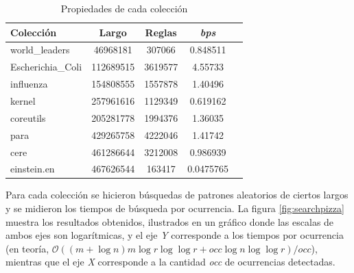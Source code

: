 \begin{table}[h!]
\centering
\begin{tabular}{|l|c|c|c|c|}
\hline
\textbf{Colección} & \textbf{Largo} & \textbf{Reglas} & \textit{bps}\\ \hline  
world\_leaders & 46968181 & 307066 &  0.848511 \\ \hline  
Escherichia\_Coli & 112689515 & 3619577 &  4.55733 \\ \hline  
influenza & 154808555 &1557878 & 1.40496\\ \hline  
kernel & 257961616 &1129349 & 0.619162 \\ \hline  
coreutils & 205281778 & 1994376 & 1.36035 \\ \hline
para&429265758 &4222046 &  1.41742 \\ \hline  
cere & 461286644 & 3212008 & 0.986939 \\ \hline
einstein.en & 467626544  & 163417 &  0.0475765 \\ \hline  
\end{tabular}
\caption{Propiedades de cada colección}
\label{tab:collect}
\end{table}



Para cada colección se hicieron búsquedas de patrones aleatorios de ciertos largos y se midieron los tiempos de búsqueda por ocurrencia. La figura \ref{fig:searchpizza} muestra los resultados obtenidos, ilustrados en un gráfico donde las escalas de ambos ejes son logarítmicas, y el eje \textit{Y} corresponde a los tiempos por ocurrencia (en teoría, $\mathcal{O}( (m + \log{n}) m \log{r} \log{\log{r}} + \textit{occ} \log{n} \log{\log{r}}) / \textit{occ}$), mientras que el eje \textit{X} corresponde a la cantidad \textit{occ} de ocurrencias detectadas.  

